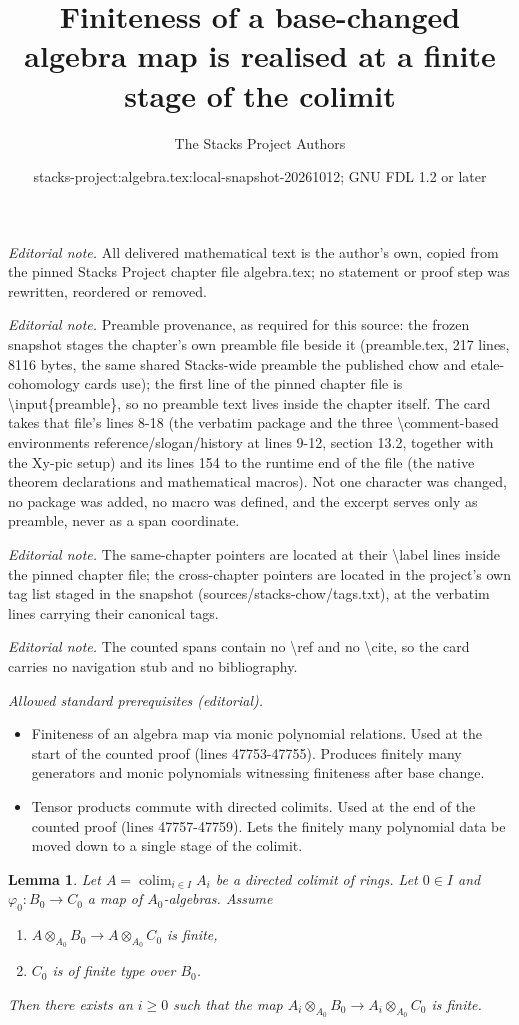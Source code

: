 \documentclass[10pt,a4paper]{amsart}
\title{Finiteness of a base-changed algebra map is realised at a finite stage of the colimit}
\author{The Stacks Project Authors}
\date{stacks-project:algebra.tex:local-snapshot-20261012; GNU FDL 1.2 or later}
\theoremstyle{plain}
\newtheorem{lemma}[subsection]{Lemma}
\theoremstyle{definition}
\theoremstyle{remark}
\numberwithin{equation}{subsection}
\def\colim{\mathop{\mathrm{colim}}\nolimits}
\begin{document}
\maketitle
\noindent\textit{Editorial note.} All delivered mathematical text is the author's own, copied from the pinned Stacks Project chapter file algebra.tex; no statement or proof step was rewritten, reordered or removed.\par\medskip
\noindent\textit{Editorial note.} Preamble provenance, as required for this source: the frozen snapshot stages the chapter's own preamble file beside it (preamble.tex, 217 lines, 8116 bytes, the same shared Stacks-wide preamble the published chow and etale-cohomology cards use); the first line of the pinned chapter file is \textbackslash{}input\{preamble\}, so no preamble text lives inside the chapter itself. The card takes that file's lines 8-18 (the verbatim package and the three \textbackslash{}comment-based environments reference/slogan/history at lines 9-12, section 13.2, together with the Xy-pic setup) and its lines 154 to the runtime end of the file (the native theorem declarations and mathematical macros). Not one character was changed, no package was added, no macro was defined, and the excerpt serves only as preamble, never as a span coordinate.\par\medskip
\noindent\textit{Editorial note.} The same-chapter pointers are located at their \textbackslash{}label lines inside the pinned chapter file; the cross-chapter pointers are located in the project's own tag list staged in the snapshot (sources/stacks-chow/tags.txt), at the verbatim lines carrying their canonical tags.\par\medskip
\noindent\textit{Editorial note.} The counted spans contain no \textbackslash{}ref and no \textbackslash{}cite, so the card carries no navigation stub and no bibliography.\par\medskip
\noindent\textit{Allowed standard prerequisites (editorial).}\begin{itemize}
\item Finiteness of an algebra map via monic polynomial relations. Used at the start of the counted proof (lines 47753-47755). Produces finitely many generators and monic polynomials witnessing finiteness after base change.
\item Tensor products commute with directed colimits. Used at the end of the counted proof (lines 47757-47759). Lets the finitely many polynomial data be moved down to a single stage of the colimit.
\end{itemize}\medskip
\begin{lemma}
\label{lemma-colimit-finite}
Let $A = \colim_{i \in I} A_i$ be a directed colimit of rings.
Let $0 \in I$ and $\varphi_0 : B_0 \to C_0$ a map of $A_0$-algebras.
Assume
\begin{enumerate}
\item $A \otimes_{A_0} B_0 \to A \otimes_{A_0} C_0$ is finite,
\item $C_0$ is of finite type over $B_0$.
\end{enumerate}
Then there exists an $i \geq 0$ such that the map
$A_i \otimes_{A_0} B_0 \to A_i \otimes_{A_0} C_0$
is finite.
\end{lemma}
\end{document}

